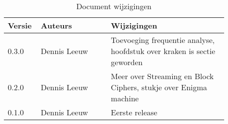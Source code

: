 \begin{flushleft}
\begin{table}[h!]
\centering
	\begin{tabularx}{\textwidth}{ |p{0.1\linewidth}|p{0.3\linewidth}|p{0.5\linewidth}| }
\hline
	Versie &
	Auteurs &
	Wijzigingen\\
\hline
	0.3.0 &
	Dennis Leeuw &
	Toevoeging frequentie analyse, hoofdstuk over kraken is sectie geworden\\
\hline
	0.2.0 &
	Dennis Leeuw &
	Meer over Streaming en Block Ciphers, stukje over Enigma machine\\
\hline
	0.1.0 &
	Dennis Leeuw &
	Eerste release\\
\hline
\hline
\end{tabularx}
\caption{Document wijzigingen}
\label{table:1}
\end{table}
\end{flushleft}

